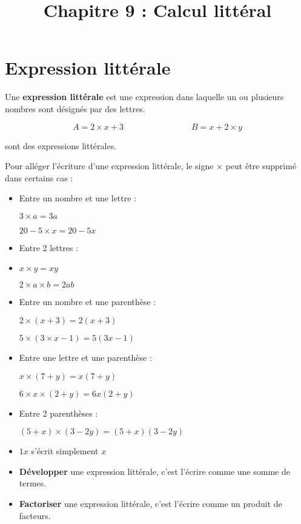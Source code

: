 \documentclass[a4paper,11pt]{article}
\title{Chapitre 9 : Calcul littéral}
\date{}
\author{}
\begin{document}
\maketitle

\section{Expression littérale}

\begin{cours}
	Une \textbf{expression littérale} est une expression dans laquelle un ou plusieurs nombres sont désignés par des lettres.
\end{cours}

\begin{exemple}
	$$ A = 2 × x + 3 \hspace{8em} B = x + 2 × y $$

	sont des expressions littérales.
\end{exemple}

\begin{cours}
	Pour alléger l'écriture d'une expression littérale, le signe × peut être supprimé dans certains cas :
	\begin{itemize}
		\item Entre un nombre et une lettre :

		      $3 × a = 3a$

		      $20 − 5 × x = 20 − 5 x$
		\item Entre 2 lettres :
		\item
		      $x× y= xy$

		      $2×a ×b = 2 ab$
		\item Entre un nombre et une parenthèse :

		      $2×(x+3) =2 (x+3)$

		      $5× (3× x - 1) =5 (3x−1)$
		\item Entre une lettre et une parenthèse :

		      $x × (7+ y) = x (7+ y)$

		      $6× x × (2 +y )= 6 x ( 2+ y)$
		\item Entre 2 parenthèses :

		      $(5 + x) × (3−2 y) = (5 + x) (3−2 y)$
		\item $1x$ s'écrit simplement $x$
	\end{itemize}
\end{cours}

\begin{cours}
	\begin{itemize}
		\item \textbf{Développer} une expression littérale, c’est l’écrire comme une somme de termes.
		\item \textbf{Factoriser} une expression littérale, c’est l’écrire comme un produit de facteurs.
	\end{itemize}
\end{cours}
\end{document}
